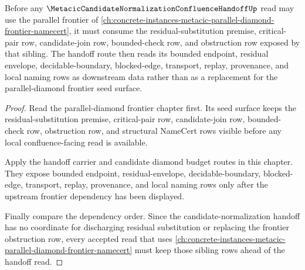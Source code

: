 \begin{theorem}
\label{thm:metacic-candidate-normalization-confluence-handoff-parallel-diamond-frontier-seed-dependency}
Before any $\MetacicCandidateNormalizationConfluenceHandoffUp$ read may use the parallel frontier of \autoref{ch:concrete-instances-metacic-parallel-diamond-frontier-namecert}, it must consume the residual-substitution premise, critical-pair row, candidate-join row, bounded-check row, and obstruction row exposed by that sibling. The handoff route then reads its bounded endpoint, residual envelope, decidable-boundary, blocked-edge, transport, replay, provenance, and local naming rows as downstream data rather than as a replacement for the parallel-diamond frontier seed surface.
\end{theorem}
\begin{proof}
Read the parallel-diamond frontier chapter first. Its seed surface keeps the residual-substitution premise, critical-pair row, candidate-join row, bounded-check row, obstruction row, and structural NameCert rows visible before any local confluence-facing read is available.

Apply the handoff carrier and candidate diamond budget routes in this chapter. They expose bounded endpoint, residual-envelope, decidable-boundary, blocked-edge, transport, replay, provenance, and local naming rows only after the upstream frontier dependency has been displayed.

Finally compare the dependency order. Since the candidate-normalization handoff has no coordinate for discharging residual substitution or replacing the frontier obstruction row, every accepted read that uses \autoref{ch:concrete-instances-metacic-parallel-diamond-frontier-namecert} must keep those sibling rows ahead of the handoff read.
\end{proof}
